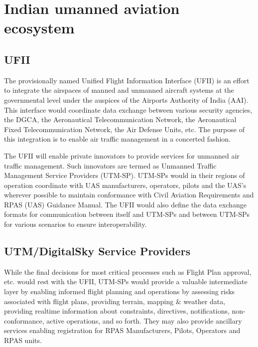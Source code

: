 \documentclass{ua_wgs_base}
\begin{document}
\section{Indian umanned aviation ecosystem
\label{subsec:ua-ecosystem}}


\subsection{UFII}

The provisionally named Unified Flight Information Interface (UFII)
is an effort to integrate the airspaces of manned and unmanned aircraft
systems at the governmental level under the auspices of the Airports
Authority of India (AAI).
This interface would coordinate data exchange between various security
agencies, the DGCA, the Aeronautical Telecommunication Network, the
Aeronautical Fixed Telecommunication Network, the Air Defense Units,
etc. The purpose of this integration is to enable air traffic management
in a concerted fashion.

The UFII will enable private innovators to provide services for unmanned
air traffic management. Such innovators are termed as Unmanned Traffic
Management Service Providers (UTM-SP). UTM-SPs would in their regions
of operation coordinate with UAS manufacturers, operators, pilots
and the UAS\textquoteright s wherever possible to maintain conformance
with Civil Aviation Requirements and RPAS (UAS) Guidance Manual. The
UFII would also define the data exchange formats for communication
between itself and UTM-SPs and between UTM-SPs for various scenarios
to ensure interoperability.

\subsection{UTM/DigitalSky Service Providers}

While the final decisions for most critical processes such as Flight
Plan approval, etc. would rest with the UFII, UTM-SPs would provide
a valuable intermediate layer by enabling informed flight planning
and operations by assessing risks associated with flight plans, providing
terrain, mapping \& weather data, providing realtime information about
constraints, directives, notifications, non-conformance, active operations,
and so forth. They may also provide ancillary services enabling registration
for RPAS Manufacturers, Pilots, Operators and RPAS units.
\end{document}
